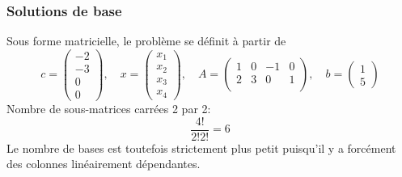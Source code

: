 \documentclass[usepdftitle=false]{beamer}
\begin{document}
\begin{frame}
\frametitle{Solutions de base}

Sous forme matricielle, le problème se définit à partir de
$$
c = \begin{pmatrix}
-2 \\ -3 \\ 0 \\ 0
\end{pmatrix}, \quad
x = \begin{pmatrix}
x_1 \\ x_2 \\ x_3 \\ x_4
\end{pmatrix},\quad
A = \begin{pmatrix}
1 & 0 & -1 & 0 \\
2 & 3 & 0 & 1 \\
\end{pmatrix},\quad
b = \begin{pmatrix}
1 \\ 5
\end{pmatrix}
$$
Nombre de sous-matrices carrées 2 par 2:
$$
\frac{4!}{2!2!} = 6
$$
Le nombre de bases est toutefois strictement plus petit puisqu'il y a forcément des colonnes linéairement dépendantes.

\end{frame}
\end{document}
